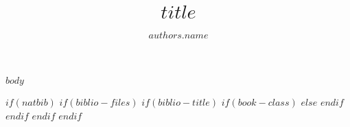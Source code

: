 \documentclass[fleqn,10pt,lineno]{wlpeerj}
\title{$title$}
\author[$authors.position$]{$authors.name$} \affil[$authors.position$]{$authors.affiliation$}
\begin{document}
\flushbottom
\maketitle
\thispagestyle{empty}


$body$

$if(natbib)$
  $if(biblio-files)$
    $if(biblio-title)$
      $if(book-class)$
      $else$
      $endif$
    $endif$
  $endif$
$endif$


\end{document}
